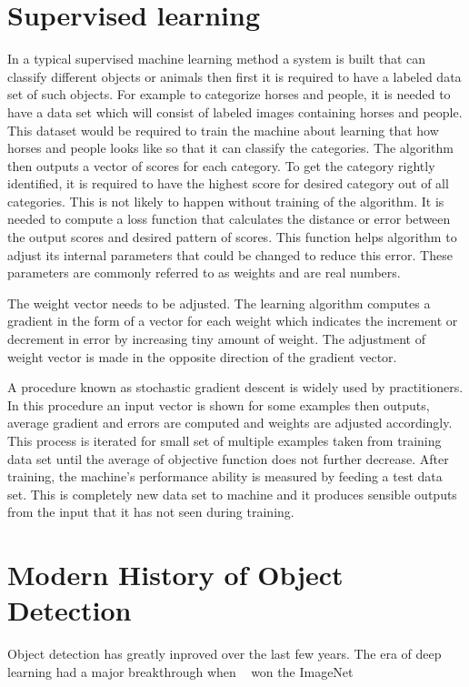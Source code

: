 \documentclass[11pt]{article}
\begin{document}
\section{Supervised learning}
In a typical supervised machine learning method a system is built that can classify different objects or animals then first it is required to have a labeled data set of such objects. For example to categorize horses and people, it is needed to have a data set which will consist of labeled images containing horses and people. This dataset would be required to train the machine about learning that how horses and people looks like so that it can classify the categories. The algorithm then outputs a vector of scores for each category. To get the category rightly identified, it is required to have the highest score for desired category out of all categories. This is not likely to happen without training of the algorithm. It is needed to compute a loss function that calculates the distance or error between the output scores and desired pattern of scores. This function helps algorithm to adjust its internal parameters that could be changed to reduce this error. These parameters are commonly referred to as weights and are real numbers.

\par
The weight vector needs to be adjusted. The learning algorithm computes a gradient in the form of a vector for each weight which indicates the increment or decrement in error by increasing tiny amount of weight. The adjustment of weight vector is made in the opposite direction of the gradient vector. \cite{lecun_deep_2015-2}

\par
A procedure known as stochastic gradient descent is widely used by practitioners. In this procedure an input vector is shown for some examples then outputs, average gradient and errors are computed and weights are adjusted accordingly. This process is iterated for small set of multiple examples taken from training data set until the average of objective function does not further decrease. After training, the machine's performance ability is measured by feeding a test data set. This is completely new data set to machine and it produces sensible outputs from the input that it has not seen during training.

\section{Modern History of Object Detection}
Object detection has greatly inproved over the last few years. The era of deep learning had a major breakthrough when ~\cite{krizhevsky_imagenet_2012} won the ImageNet  \cite{lecun_deep_2015} 
\end{document}

